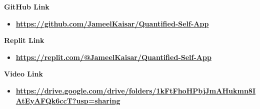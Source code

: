 \documentclass{article}
\begin{document}
\vspace{1cm}
{\huge \textbf{GitHub Link}}\\
\begin{itemize}
    \item \textbf{\url{https://github.com/JameelKaisar/Quantified-Self-App}}
\end{itemize}

\vspace{1cm}
{\huge \textbf{Replit Link}}\\
\begin{itemize}
    \item \textbf{\url{https://replit.com/@JameelKaisar/Quantified-Self-App}}
\end{itemize}

\vspace{1cm}
{\huge \textbf{Video Link}}\\
\begin{itemize}
    \item \textbf{\url{https://drive.google.com/drive/folders/1kFtFhoHPbjJmAHukmn8IAtEyAFQk6ccT?usp=sharing}}
\end{itemize}
\end{document}
